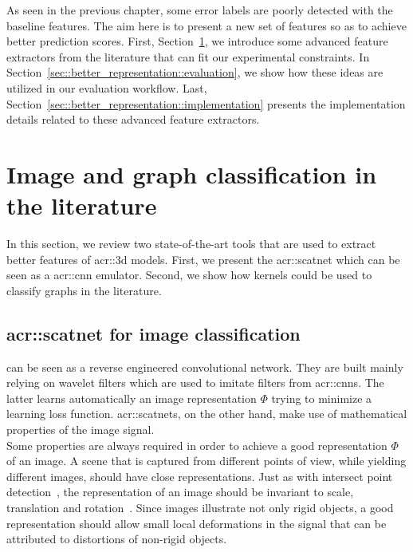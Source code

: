 \minitoc

\vfill

As seen in the previous chapter, some error labels are poorly detected with the baseline features.
The aim here is to present a new set of features so as to achieve better prediction scores.
First, Section~\ref{sec::better_representation::literature}, we introduce some advanced feature extractors from the literature that can fit our experimental constraints.
In Section~\ref{sec::better_representation::evaluation}, we show how these ideas are utilized in our evaluation workflow.
Last, Section~\ref{sec::better_representation::implementation} presents the implementation details related to these advanced feature extractors.

\clearpage

\section{Image and graph classification in the literature}
    \label{sec::better_representation::literature}
    In this section, we review two state-of-the-art tools that are used to extract better features of \gls{acr::3d} models.
    First, we present the \gls{acr::scatnet} which can be seen as a \gls{acr::cnn} emulator.
    Second, we show how kernels could be used to classify graphs in the literature.

    \subsection{\acrshort*{acr::scatnet} for image classification}
        \label{subsec::better_representation::literature::scatnet}
         can be seen as a reverse engineered convolutional network.
        They are built mainly relying on wavelet filters which are used to imitate filters from \glspl{acr::cnn}.
        The latter learns automatically an image representation $\Phi$ trying to minimize a learning loss function.
        \Glspl{acr::scatnet}, on the other hand, make use of mathematical properties of the image signal.\\

        Some properties are always required in order to achieve a good representation $\Phi$ of an image. 
        A scene that is captured from different points of view, while yielding different images, should have close representations.
        Just as with intersect point detection~\parencite{lowe2004distinctive}, the representation of an image should be invariant to scale, translation and rotation~\parencite{mallat2012group,sifre2013rotation,bruna2013invariant}.
        Since images illustrate not only rigid objects, a good representation should allow small local deformations in the signal that can be attributed to distortions of non-rigid objects.\\

